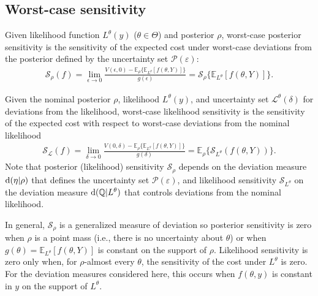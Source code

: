\documentclass[11pt,reqno,letter]{amsart}
\theoremstyle{plain}
\theoremstyle{definition}
\numberwithin{equation}{section}
\numberwithin{theorem}{section}
\numberwithin{table}{section}
\numberwithin{figure}{section}
\begin{document}
\subsection{Worst-case sensitivity}

Given likelihood function $L^\theta(y)$ ($\theta\in\Theta$) and posterior $\rho$, 
worst-case posterior sensitivity is the sensitivity of the expected cost under worst-case deviations from the posterior defined by the uncertainty set ${\mathcal P}(\varepsilon)$:
\begin{eqnarray*}
{\mathcal S}_\rho(f)  =  \lim_{\epsilon\rightarrow 0}\frac{V(\epsilon, 0)- {\mathbb E}_\rho\Big\{{\mathbb E}_{L^\theta}[f(\theta, Y)]\Big\}}{g({\epsilon})}%
=
{\mathcal S}_\rho\Big\{{\mathbb E}_{L^\theta}[f(\theta, Y)]\Big\}.
\end{eqnarray*}

Given the nominal posterior $\rho$, likelihood  $L^\theta(y)$, and uncertainty set ${\mathcal L}^\theta(\delta)$ for deviations from the likelihood, worst-case likelihood sensitivity is the sensitivity of the expected cost with respect to worst-case deviations from the nominal likelihood
\begin{eqnarray*}
{\mathcal S}_{\mathcal L}(f)  =  \lim_{\delta\rightarrow 0}\frac{V(0, \delta)- {\mathbb E}_\rho\Big\{{\mathbb E}_{L^\theta}[f(\theta, Y)]\Big\}}{g(\delta)}%
 =  {\mathbb E}_\rho \Big\{{\mathcal S}_{L^\theta}(f(\theta, Y))\Big\}.
\end{eqnarray*}
Note that posterior (likelihood) sensitivity ${\mathcal S}_\rho$  depends on the deviation measure ${\rm d}(\eta|\rho)$  that defines the uncertainty set ${\mathcal P}(\varepsilon)$, and likelihood sensitivity  ${\mathcal S}_{L^\theta}$ on the deviation measure  ${\rm d}({\mathbb Q}|L^\theta)$ that controls deviations from the nominal likelihood. 





In general, ${\mathcal S}_\rho$ is a generalized measure of deviation \cite{gotoh2026sensitivity,rockafellar2006generalized} so posterior sensitivity is zero when $\rho$ is a point mass (i.e., there is no uncertainty about $\theta$) or when $g(\theta) = {\mathbb E}_{L^\theta}[f(\theta, Y)]$ is constant on the support of $\rho$. %
Likelihood sensitivity is zero only when, for $\rho$-almost every $\theta$, the sensitivity of the cost under $L^\theta$ is zero. For the deviation measures considered here, this occurs when $f(\theta, y)$ is constant in $y$ on the support of $L^\theta$.
\end{document}
